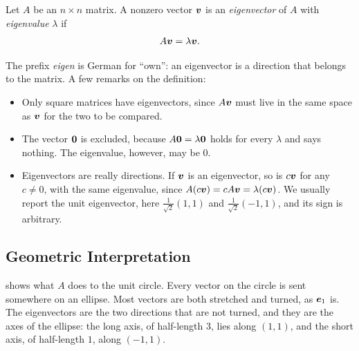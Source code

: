 \begin{definition}
  \label{def:eigen}
  Let $A$ be an $n \times n$ matrix. A nonzero vector $\bm{v}$ is an
  \emph{eigenvector} of $A$ with \emph{eigenvalue} $\lambda$ if
  \[
    A\bm{v} = \lambda \bm{v} .
  \]
\end{definition}

The prefix \emph{eigen} is German for ``own'': an eigenvector is a
direction that belongs to the matrix. A few remarks on the definition:
\begin{itemize}
  \item Only square matrices have eigenvectors, since $A\bm{v}$ must
    live in the same space as $\bm{v}$ for the two to be compared.
  \item The vector $\bm{0}$ is excluded, because $A\bm{0} =
    \lambda\bm{0}$ holds for every $\lambda$ and says nothing. The
    eigenvalue, however, may be $0$.
  \item Eigenvectors are really directions. If $\bm{v}$ is an
    eigenvector, so is $c\bm{v}$ for any $c \ne 0$, with the same
    eigenvalue, since $A(c\bm{v}) = cA\bm{v} = \lambda (c\bm{v})$.
    We usually report the unit eigenvector, here
    $\tfrac{1}{\sqrt2}(1, 1)$ and $\tfrac{1}{\sqrt2}(-1, 1)$, and its sign
    is arbitrary.
\end{itemize}

\subsection{Geometric Interpretation}
\label{sec:ch04-eigen-geometry}

 shows what $A$ does to the unit circle. Every
vector on the circle is sent somewhere on an ellipse. Most vectors are
both stretched and turned, as $\bm{e}_1$ is. The eigenvectors are the
two directions that are not turned, and they are the axes of the ellipse:
the long axis, of half-length $3$, lies along $(1, 1)$, and the short
axis, of half-length $1$, along $(-1, 1)$.


